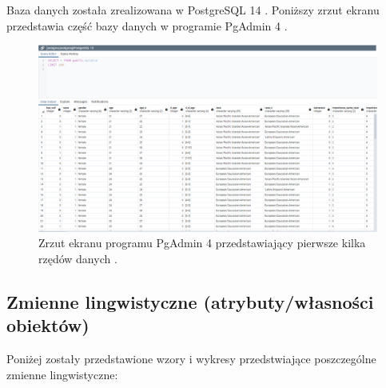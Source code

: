 \documentclass{classrep}
\begin{document}
Baza danych została zrealizowana w PostgreSQL 14 \cite{postgres}. Poniższy zrzut ekranu przedstawia część bazy danych w programie PgAdmin 4 \cite{pgadmin}.
\begin{figure}[H]
\centering
\includegraphics[scale=0.2]{bazadanych.png}
\caption{Zrzut ekranu programu PgAdmin 4 przedstawiający pierwsze kilka rzędów danych \cite{database}.} 
\end{figure}





\subsection{Zmienne lingwistyczne (atrybuty/własności obiektów)}

Poniżej zostały przedstawione wzory i wykresy przedstwiające poszczególne zmienne lingwistyczne:
\end{document}
